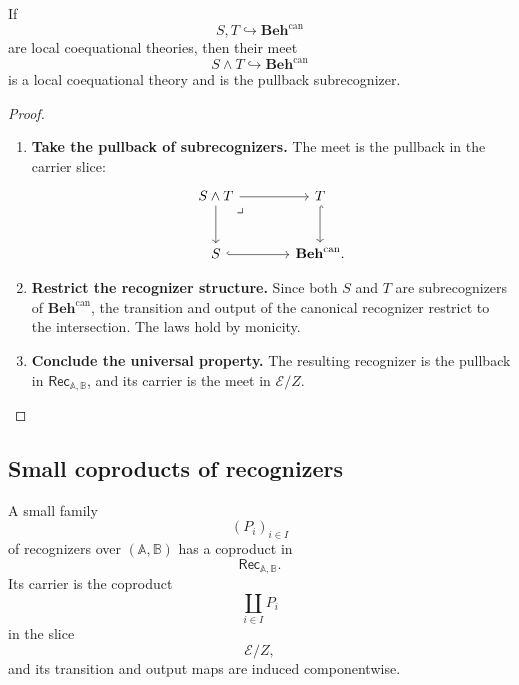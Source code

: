 \begin{lemma}
\label{lem:meets-local-theories}
    If
    \[
        S,T\hookrightarrow\mathbf{Beh}^{\mathrm{can}}
    \]
    are local coequational theories, then their meet
    \[
        S\wedge T\hookrightarrow\mathbf{Beh}^{\mathrm{can}}
    \]
    is a local coequational theory and is the pullback subrecognizer.
\end{lemma}

\begin{proof}
    \leavevmode
    \begin{enumerate}
        \item \textbf{Take the pullback of subrecognizers.}
        The meet is the pullback in the carrier slice:
        \[
        \begin{tikzcd}[column sep=large, row sep=large]
            S\wedge T
                \arrow[r]
                \arrow[d]
                \arrow[dr, phantom, "\lrcorner", very near start]
            &
            T
                \arrow[d, hook]
            \\
            S
                \arrow[r, hook]
            &
            \mathbf{Beh}^{\mathrm{can}} .
        \end{tikzcd}
        \]

        \item \textbf{Restrict the recognizer structure.}
        Since both \(S\) and \(T\) are subrecognizers of
        \(\mathbf{Beh}^{\mathrm{can}}\), the transition and output of the
        canonical recognizer restrict to the intersection. The laws hold by
        monicity.

        \item \textbf{Conclude the universal property.}
        The resulting recognizer is the pullback in
        \(\mathsf{Rec}_{\mathbb A,\mathbb B}\), and its carrier is the meet in
        \(\mathcal E/Z\).
    \end{enumerate}
\end{proof}

\subsection{Small coproducts of recognizers}
\label{subsec:small-coproducts-recognizers}

\begin{proposition}
\label{prop:small-coproducts-recognizers}
    A small family
    \[
        (P_i)_{i\in I}
    \]
    of recognizers over \((\mathbb A,\mathbb B)\) has a coproduct in
    \[
        \mathsf{Rec}_{\mathbb A,\mathbb B}.
    \]
    Its carrier is the coproduct
    \[
        \coprod_{i\in I}P_i
    \]
    in the slice
    \[
        \mathcal E/Z,
    \]
    and its transition and output maps are induced componentwise.
\end{proposition}

